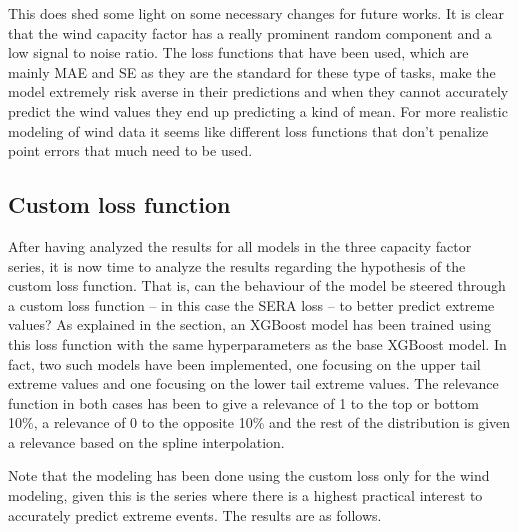 This does shed some light on some necessary changes for future works. It is clear that the wind capacity factor has a really prominent random component and a low signal to noise ratio. The loss functions that have been used, which are mainly MAE and SE as they are the standard for these type of tasks, make the model extremely risk averse in their predictions and when they cannot accurately predict the wind values they end up predicting a kind of mean. For more realistic modeling of wind data it seems like different loss functions that don't penalize point errors that much need to be used. 

\subsection{Custom loss function}
After having analyzed the results for all models in the three capacity factor series, it is now time to analyze the results regarding the hypothesis of the custom loss function. That is, can the behaviour of the model be steered through a custom loss function -- in this case the SERA loss -- to better predict extreme values? As explained in the  section, an XGBoost model has been trained using this loss function with the same hyperparameters as the base XGBoost model. In fact, two such models have been implemented, one focusing on the upper tail extreme values and one focusing on the lower tail extreme values. The relevance function in both cases has been to give a relevance of 1 to the top or bottom 10\%, a relevance of 0 to the opposite 10\% and the rest of the distribution is given a relevance based on the spline interpolation. 

Note that the modeling has been done using the custom loss only for the wind modeling, given this is the series where there is a highest practical interest to accurately predict extreme events. The results are as follows. 

